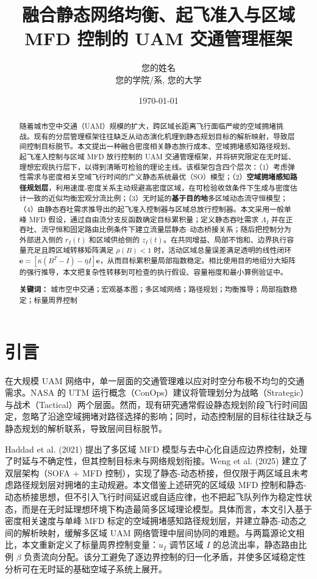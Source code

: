 \documentclass[a4paper,12pt]{article}
\title{\textbf{融合静态网络均衡、起飞准入与区域 MFD 控制的 UAM 交通管理框架}}
\author{您的姓名 \\ 您的学院/系, 您的大学}
\date{\today}
\theoremstyle{plain}
\theoremstyle{definition}
\theoremstyle{remark}
\begin{document}
\maketitle

\begin{abstract}
随着城市空中交通（UAM）规模的扩大，跨区域长距离飞行面临严峻的空域拥堵挑战。现有的分层管理框架往往缺乏从动态演化机理到静态规划目标的解析映射，导致层间控制目标脱节。本文提出一种融合密度相关静态旅行成本、空域拥堵感知路径规划、起飞准入控制与区域 MFD 放行控制的 UAM 交通管理框架，并将研究限定在无时延、理想宏观执行层下，以得到清晰可检验的理论主线。该框架包含四个层次：（1）考虑弹性需求与密度相关空域飞行时间的广义静态系统最优（SO）模型；（2）\textbf{空域拥堵感知路径规划层}，利用速度-密度关系主动规避高密度区域，在可检验收敛条件下生成与密度估计一致的近似均衡宏观分流比例；（3）无时延的\textbf{基于目的地}多区域动态流守恒模型；（4）由静态吞吐需求推导出的起飞准入控制器与区域总放行控制器。本文采用一般单峰 MFD 假设，通过自由流分支反函数确定目标累积量；定义静态吞吐需求 $\Lambda_I$ 并在正吞吐、流守恒和固定路由比例条件下建立流量层静态--动态桥接关系；随后把控制分为外部进入侧的 $r_I(t)$ 和区域供给侧的 $z_I(t)$。在共同增益、局部不饱和、边界执行容量充足且跨区域转移矩阵满足 $\rho(B)<1$ 时，活动区域总量误差满足透明的线性闭环 $\dot{\bm e}=[\kappa(B^T-I)-\eta I]\bm e$，从而目标累积量局部指数稳定。相比使用目的地组分大矩阵的强行推导，本文把复杂性转移到可检查的执行假设、容量裕度和最小算例验证中。

\textbf{关键词：} 城市空中交通；宏观基本图；多区域网络；路径规划；均衡推导；局部指数稳定；标量周界控制
\end{abstract}

\section{引言}
在大规模 UAM 网络中，单一层面的交通管理难以应对时空分布极不均匀的交通需求。NASA 的 UTM 运行概念（ConOps）建议将管理划分为战略（Strategic）与战术（Tactical）两个层面。然而，现有研究通常假设静态规划阶段飞行时间固定，忽略了沿途空域拥堵对路径选择的影响；同时，动态控制层的目标往往缺乏与静态规划的解析联系，导致层间目标脱节。

Haddad et al. (2021) 提出了多区域 MFD 模型与去中心化自适应边界控制，处理了时延与不确定性，但其控制目标未与网络规划衔接。Weng et al. (2025) 建立了双层架构（SOFA + MFD 控制），实现了静态-动态桥接，但仅限于两区域且未考虑路径规划层对拥堵的主动规避。本文借鉴上述研究的区域级 MFD 控制和静态-动态桥接思想，但不引入飞行时间延迟或自适应律，也不把起飞队列作为稳定性状态，而是在无时延理想环境下构造最简多区域理论模型。具体而言，本文引入基于密度相关速度与单峰 MFD 标定的空域拥堵感知路径规划层，并建立静态-动态之间的解析映射，缓解多区域 UAM 网络管理中层间协同的难题。与两篇源论文相比，本文重新定义了标量周界控制变量：$u_I$ 调节区域 $I$ 的总流出率，静态路由比例 $\beta$ 负责流向分配。该分工避免了逐边界控制的归一化矛盾，并使多区域稳定性分析可在无时延的基础空域子系统上展开。
\end{document}
